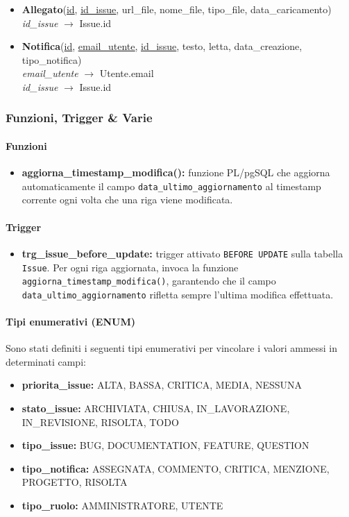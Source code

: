 \begin{itemize}
    \item \textbf{Allegato}(\underline{id}, \underline{\underline{id\_issue}}, url\_file, nome\_file, tipo\_file, data\_caricamento)\\
    \textit{id\_issue} $\rightarrow$ Issue.id

    \item \textbf{Notifica}(\underline{id}, \underline{\underline{email\_utente}}, \underline{\underline{id\_issue}}, testo, letta, data\_creazione, tipo\_notifica)\\
    \textit{email\_utente} $\rightarrow$ Utente.email\\
    \textit{id\_issue} $\rightarrow$ Issue.id
\end{itemize}

\subsubsection{Funzioni, Trigger \& Varie}

\paragraph{Funzioni}
\begin{itemize}
    \item \textbf{aggiorna\_timestamp\_modifica():} funzione PL/pgSQL che aggiorna automaticamente il campo \texttt{data\_ultimo\_aggiornamento} al timestamp corrente ogni volta che una riga viene modificata.
\end{itemize}

\paragraph{Trigger}
\begin{itemize}
    \item \textbf{trg\_issue\_before\_update:} trigger attivato \texttt{BEFORE UPDATE} sulla tabella \texttt{Issue}. Per ogni riga aggiornata, invoca la funzione \texttt{aggiorna\_timestamp\_modifica()}, garantendo che il campo \texttt{data\_ultimo\_aggiornamento} rifletta sempre l'ultima modifica effettuata.
\end{itemize}

\paragraph{Tipi enumerativi (ENUM)}
Sono stati definiti i seguenti tipi enumerativi per vincolare i valori ammessi in determinati campi:
\begin{itemize}
    \item \textbf{priorita\_issue:} ALTA, BASSA, CRITICA, MEDIA, NESSUNA
    \item \textbf{stato\_issue:} ARCHIVIATA, CHIUSA, IN\_LAVORAZIONE, IN\_REVISIONE, RISOLTA, TODO
    \item \textbf{tipo\_issue:} BUG, DOCUMENTATION, FEATURE, QUESTION
    \item \textbf{tipo\_notifica:} ASSEGNATA, COMMENTO, CRITICA, MENZIONE, PROGETTO, RISOLTA
    \item \textbf{tipo\_ruolo:} AMMINISTRATORE, UTENTE
\end{itemize}

